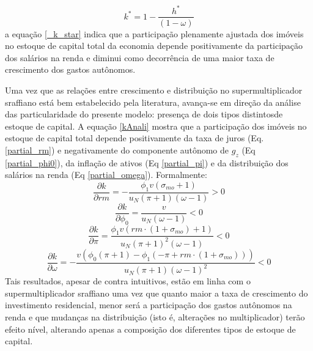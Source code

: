 \begin{equation}
\label{_k_star}
k^* = 1 - \frac{h^*}{(1 - \omega)}
\end{equation}
a equação \ref{_k_star} indica que a participação plenamente ajustada dos imóveis no estoque de capital total da economia depende positivamente da participação dos salários na renda e diminui como decorrência de uma maior taxa de crescimento dos gastos autônomos.

Uma vez que as relações entre crescimento e distribuição no supermultiplicador sraffiano está bem estabelecido pela literatura, avança-se em direção da análise das particularidade do presente modelo: presença de dois tipos distintosde estoque de capital.
A equação \ref{kAnali} mostra que a participação dos imóveis no estoque de capital total depende 
positivamente da taxa de juros (Eq. \ref{partial_rm}) e 
negativamente do componente autônomo de $g_z$ (Eq \ref{partial_phi0}), da inflação de ativos (Eq \ref{partial_pi}) e da distribuição dos salários na renda (Eq \ref{partial_omega}). Formalmente:
\begin{equation}
\label{partial_rm}
\frac{\partial k}{\partial rm} = - \frac{\phi_{1} v \left(\sigma_{mo} + 1\right)}{u_N \left(\pi + 1\right) \left(\omega - 1\right)} > 0
\end{equation}
\begin{equation}
\label{partial_phi0}
\frac{\partial k}{\partial \phi_0} = \frac{v}{u_N \left(\omega - 1\right)} < 0
\end{equation}
\begin{equation}
\label{partial_pi}
\frac{\partial k}{\partial \pi} = \frac{\phi_{1} v \left(rm\cdot(1+\sigma_{mo}) + 1\right)}{u_N \left(\pi + 1\right)^{2} \left(\omega - 1\right)} < 0
\end{equation}
\begin{equation}
\label{partial_omega}
\frac{\partial k}{\partial \omega} = - \frac{v \left(\phi_{0} \left(\pi + 1\right) - \phi_{1} \left(- \pi + rm\cdot(1 + \sigma_{mo})\right)\right)}{u_N \left(\pi + 1\right) \left(\omega - 1\right)^{2}} < 0
\end{equation}
Tais resultados, apesar de contra intuitivos, estão em linha com o supermultiplicador sraffiano uma vez que quanto maior a taxa de crescimento do investimento residencial, menor será a participação dos gastos autônomos na renda e que mudanças na distribuição (isto é, alterações no multiplicador) terão efeito nível, alterando apenas a composição dos diferentes tipos de estoque de capital. 


